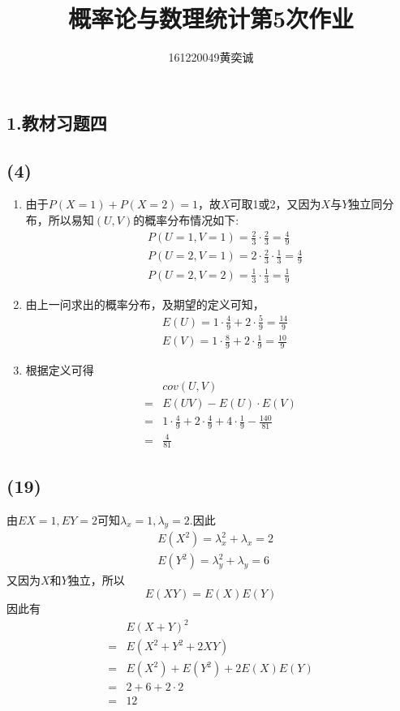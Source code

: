 \documentclass[twocolumn]{article}
\begin{document}
	\begin{CJK}{UTF8}{gbsn}		
			\title{概率论与数理统计第5次作业}
			\author{161220049\quad 黄奕诚}
			\maketitle
			
			\section*{1.教材习题四}
			\subsection*{(4)}
				\begin{enumerate}[(1)]
					\item 由于$P(X=1)+P(X=2)=1$，故$X$可取1或2，又因为$X$与$Y$独立同分布，所以易知$(U,V)$的概率分布情况如下:
					\begin{align*}
						& P(U=1,V=1)=\frac{2}{3}\cdot\frac{2}{3}=\frac{4}{9}\\
						& P(U=2,V=1)=2\cdot\frac{2}{3}\cdot\frac{1}{3}=\frac{4}{9}\\
						& P(U=2,V=2)=\frac{1}{3}\cdot\frac{1}{3}=\frac{1}{9}
					\end{align*}
					\item 由上一问求出的概率分布，及期望的定义可知，
					\begin{align*}
						& E(U) = 1\cdot\frac{4}{9}+2\cdot\frac{5}{9}=\frac{14}{9} \\
						& E(V) = 1\cdot\frac{8}{9}+2\cdot\frac{1}{9}=\frac{10}{9}
					\end{align*}
					\item 根据定义可得
					\begin{align*}
						& cov(U,V)\\
						= & E(UV)-E(U)\cdot E(V)\\
						= & 1\cdot\frac{4}{9}+2\cdot\frac{4}{9}+4\cdot\frac{1}{9}-\frac{140}{81}\\
					    = & \frac{4}{81}
					\end{align*}
				\end{enumerate}
			\subsection*{(19)}
				由$EX=1,EY=2$可知$\lambda_x=1,\lambda_y=2$.因此
				\begin{align*}
					& E(X^2)=\lambda_x^2+\lambda_x=2 \\
					& E(Y^2)=\lambda_y^2+\lambda_y=6
				\end{align*}
				又因为$X$和$Y$独立，所以\[E(XY)=E(X)E(Y)\]
				因此有\begin{align*}
					& E(X+Y)^2 \\
					= & E(X^2+Y^2+2XY) \\
					= & E(X^2)+E(Y^2)+2E(X)E(Y) \\
					= & 2+6+2\cdot2 \\
					= & 12 
				\end{align*}

\end{CJK}
\end{document}
